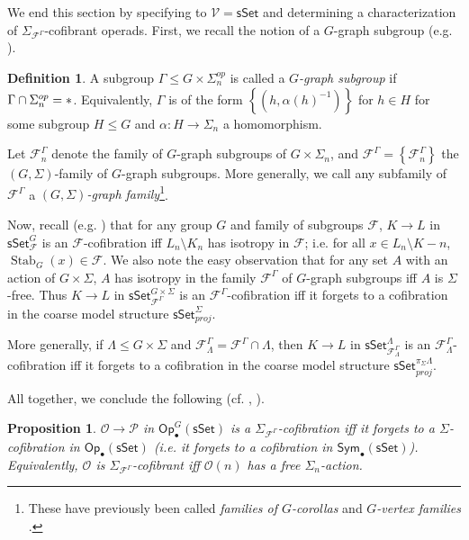 \documentclass[a4paper,10pt
,draft
]{article}%
\numberwithin{equation}{section}
\numberwithin{figure}{section}
\newtheorem{proposition}[equation]{Proposition}%
\theoremstyle{definition} %
\newtheorem{definition}[equation]{Definition}%
\newcommand{\set}[1]{\left\{#1\right\}}%
\newcommand{\Sym}{\ensuremath{\mathsf{Sym}}}%
\newcommand{\sSet}{\ensuremath{\mathsf{sSet}}}%
\newcommand{\Op}{\mathsf{Op}}%
\DeclareMathOperator{\Stab}{Stab}
\newcommand{\F}{\ensuremath{\mathcal F}}
\newcommand{\V}{\ensuremath{\mathcal V}}
\renewcommand{\O}{\ensuremath{\mathcal O}}
\renewcommand{\P}{\ensuremath{\mathcal P}}
\newcommand{\1}{\ensuremath{\mathbbm 1}}%
\begin{document}
We end this section by specifying to $\V = \sSet$ and determining a characterization of $\Sigma_{\F^\Gamma}$-cofibrant operads.
First, we recall the notion of a $G$-graph subgroup (e.g. \cite[Defn. 6.34]{BP_geo}).
\begin{definition}
      \label{GRAPHSUB_DEF}
      A subgroup $\Gamma \leq G \times \Sigma_n^{op}$ is called a \textit{$G$-graph subgroup} if
      $\Gamma \cap \Sigma_n^{op} = \**$.
      Equivalently, $\Gamma$ is of the form $\set{(h, \alpha(h)^{-1})}$ for $h \in H$ for some subgroup $H \leq G$ and $\alpha \colon H \to \Sigma_n$ a homomorphism.

      Let $\F_n^\Gamma$ denote the family of $G$-graph subgroups of $G \times \Sigma_n$, and $\F^\Gamma = \set{\F_n^{\Gamma}}$ the $(G,\Sigma)$-family of $G$-graph subgroups.
      More generally, we call any subfamily of $\F^{\Gamma}$ a \textit{$(G,\Sigma)$-graph family}\footnote{These have previously been called \textit{families of $G$-corollas} \cite[Defn. 4.44]{BP_geo} and \textit{$G$-vertex families} \cite[Defn. 9.3]{Per18}.}.
\end{definition}

Now, recall (e.g. \cite[Prop. 2.16]{Ste16}) that for any group $G$ and family of subgroups $\F$,
$K \to L$ in $\sSet^{G}_\F$ is an $\F$-cofibration iff $L_n \setminus K_n$ has isotropy in $\F$; i.e. for all $x \in L_n \setminus K-n$, $\Stab_{G}(x) \in \F$. 
% 
We also note the easy observation that for any set $A$ with an action of $G \times \Sigma$,
$A$ has isotropy in the family $\F^\Gamma$ of $G$-graph subgroups
iff
$A$ is $\Sigma$-free.
% 
Thus $K \to L$ in $\sSet^{G \times \Sigma}_{\F^\Gamma}$ is an $\F^\Gamma$-cofibration
iff
it forgets to a cofibration in the coarse model structure $\sSet^\Sigma_{proj}$.

More generally, if $\Lambda \leq G \times \Sigma$ and $\F^\Gamma_{\Lambda} = \F^\Gamma \cap \Lambda$,
then $K \to L$ in $\sSet^{\Lambda}_{\F^\Gamma_\Lambda}$ is an $\F^\Gamma_\Lambda$-cofibration
iff
it forgets to a cofibration in the coarse model structure $\sSet^{\pi_{\Sigma}\Lambda}_{proj}$.
      
All together, we conclude the following (cf. \cite[Remark 6.7]{Per18}, \cite[discussion before Thm. 2.31]{BP_edss}).

\begin{proposition}
      \label{SGS_COF_PROP}
      $\O \to \P$ in $\Op_\bullet^G(\sSet)$ is a $\Sigma_{\F^\Gamma}$-cofibration iff
      it forgets to a $\Sigma$-cofibration in $\Op_\bullet(\sSet)$
      (i.e. it forgets to a cofibration in $\Sym_\bullet(\sSet)$).
      Equivalently, $\O$ is $\Sigma_{\F^\Gamma}$-cofibrant iff $\O(n)$ has a free $\Sigma_n$-action.
\end{proposition}








\newpage

{}

\end{document}
